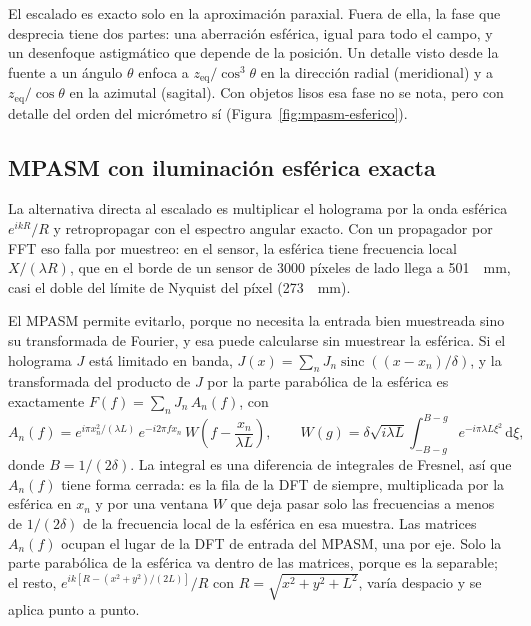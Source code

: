 El escalado es exacto solo en la aproximación paraxial. Fuera de ella, la fase
que desprecia tiene dos partes: una aberración esférica, igual para todo el
campo, y un desenfoque astigmático que depende de la posición. Un detalle visto
desde la fuente a un ángulo $\theta$ enfoca a $z_\mathrm{eq}/\cos^3\theta$ en
la dirección radial (meridional) y a $z_\mathrm{eq}/\cos\theta$ en la azimutal
(sagital). Con
objetos lisos esa fase no se nota, pero con detalle del orden del micrómetro
sí (Figura~\ref{fig:mpasm-esferico}).

\subsection{MPASM con iluminación esférica exacta}
\label{sec:mpasm-esferico}

La alternativa directa al escalado es multiplicar el holograma por la onda
esférica $e^{ikR}/R$ y retropropagar con el espectro angular exacto. Con un
propagador por FFT eso falla por muestreo: en el sensor, la esférica tiene
frecuencia local $X/(\lambda R)$, que en el borde de un sensor de 3000
píxeles de lado llega a \SI{501}{\per\milli\metre}, casi el doble del límite
de Nyquist del píxel (\SI{273}{\per\milli\metre}).

El MPASM permite evitarlo, porque no necesita la entrada bien muestreada sino
su transformada de Fourier, y esa puede calcularse sin muestrear la esférica.
Si el holograma $J$ está limitado en banda, $J(x) = \sum_n J_n
\operatorname{sinc}\!\left((x - x_n)/\delta\right)$, y la transformada del
producto de $J$ por la parte parabólica de la esférica es exactamente
$F(f) = \sum_n J_n\, A_n(f)$, con
\begin{equation}
  A_n(f) = e^{i\pi x_n^2/(\lambda L)}\, e^{-i2\pi f x_n}\,
  W\!\left(f - \frac{x_n}{\lambda L}\right),
  \qquad
  W(g) = \delta\sqrt{i\lambda L}\int_{-B-g}^{B-g} e^{-i\pi\lambda L \xi^2}\,\mathrm{d}\xi,
  \label{eq:ventana-chirp}
\end{equation}
donde $B = 1/(2\delta)$. La integral es una diferencia de integrales de
Fresnel, así que $A_n(f)$ tiene forma cerrada: es la fila de la DFT de siempre,
multiplicada por la esférica en $x_n$ y por una ventana $W$ que deja pasar solo
las frecuencias a menos de $1/(2\delta)$ de la frecuencia local de la esférica
en esa muestra. Las matrices $A_n(f)$ ocupan el lugar de la DFT de entrada del
MPASM, una por eje. Solo la parte parabólica de la esférica va dentro de las
matrices, porque es la separable; el resto,
$e^{ik[R - (x^2 + y^2)/(2L)]}/R$ con $R = \sqrt{x^2 + y^2 + L^2}$, varía
despacio y se aplica punto a punto.

